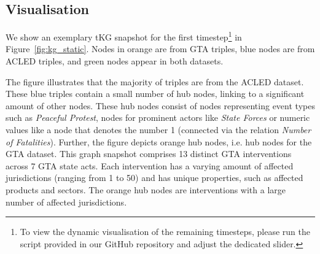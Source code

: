 \subsection{Visualisation}
We show an exemplary tKG snapshot for the first timestep\footnote{To view the dynamic visualisation of the remaining timesteps, please run the script provided in our GitHub repository and adjust the dedicated slider.}
in Figure~\ref{fig:kg_static}. 
Nodes in orange are from GTA triples, blue nodes are from ACLED triples, and green nodes appear in both datasets.

The figure illustrates that the majority of triples are from the ACLED dataset. These blue triples contain a small number of hub nodes, linking to a significant amount of other nodes. These hub nodes consist of nodes representing event types such as \textit{Peaceful Protest}, nodes for prominent actors like \textit{State Forces} or numeric values like a node that denotes the number 1 (connected via the relation \textit{Number of Fatalities}). 
Further, the figure depicts orange hub nodes, i.e. hub nodes for the GTA dataset. This graph snapshot comprises 13 distinct GTA interventions across 7 GTA state acts. Each intervention has a varying amount of affected jurisdictions (ranging from 1 to 50) and has unique properties, such as affected products and sectors. The orange hub nodes are interventions with a large number of affected jurisdictions.
